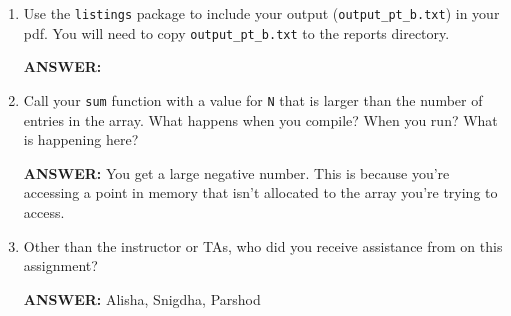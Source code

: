 \begin{enumerate}
    \item Use the \texttt{listings} package to include your output (\texttt{output\_pt\_b.txt}) in your pdf.  You will need to copy \texttt{output\_pt\_b.txt} to the reports directory.

    \textbf{ANSWER:} 

    \item Call your \texttt{sum} function with a value for \texttt{N} that is larger than the number of entries in the array.  What happens when you compile?  When you run?  What is happening here?

    \textbf{ANSWER:} You get a large negative number. This is because you're accessing a point in memory that isn't allocated to the array you're trying to access.

    \item Other than the instructor or TAs, who did you receive assistance from on this assignment?
    
    \textbf{ANSWER:} Alisha, Snigdha, Parshod
\end{enumerate}
